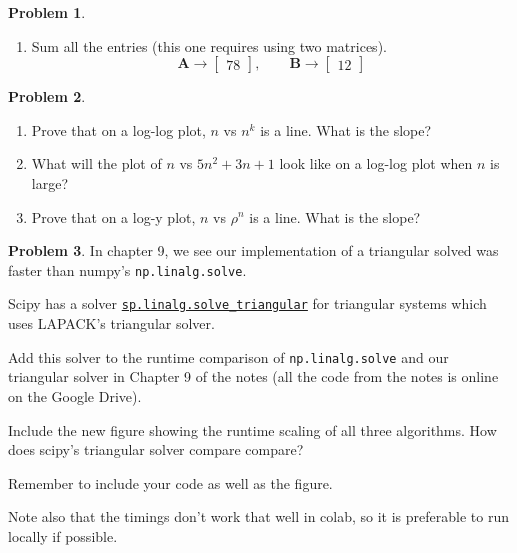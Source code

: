 \documentclass[12pt]{article}
\theoremstyle{definition}
\newtheorem{problem}{Problem}
\renewcommand{\vec}{\mathbf}
\begin{document}
\begin{problem}
\begin{enumerate}
    \item Sum all the entries (this one requires using two matrices).
    \[
        \vec{A} \to  
        \begin{bmatrix}
            78
        \end{bmatrix}
        ,\qquad 
        \vec{B} \to 
        \begin{bmatrix}
            12
        \end{bmatrix}
    \]

    \end{enumerate}
\end{problem}


\begin{problem}

    \begin{enumerate}
        \item Prove that on a log-log plot, $n$ vs $n^k$ is a line. What is the slope?
        \item What will the plot of $n$ vs $5n^2 + 3n + 1$ look like on a log-log plot when $n$ is large?
        \item Prove that on a log-y plot, $n$ vs $\rho^n$ is a line. What is the slope?
    \end{enumerate}

\end{problem}

\begin{problem}

    In chapter 9, we see our implementation of a triangular solved was faster than numpy's \lstinline{np.linalg.solve}.

    Scipy has a solver \href{https://docs.scipy.org/doc/scipy/reference/generated/scipy.linalg.solve_triangular.html}{\lstinline{sp.linalg.solve_triangular}} for triangular systems which uses LAPACK's triangular solver.

    Add this solver to the runtime comparison of \lstinline{np.linalg.solve} and our triangular solver in Chapter 9 of the notes (all the code from the notes is online on the Google Drive).
    
    Include the new figure showing the runtime scaling of all three algorithms.
    How does scipy's triangular solver compare compare?

    Remember to include your code as well as the figure.

    Note also that the timings don't work that well in colab, so it is preferable to run locally if possible.

\end{problem}
\end{document}
